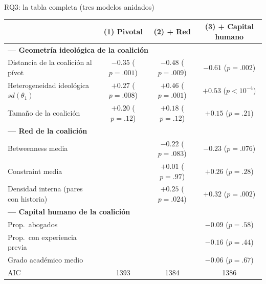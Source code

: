 \documentclass[aspectratio=169,11pt]{beamer}
\newcommand{\emphr}[1]{{\color{ndreddark}\textbf{#1}}}
\begin{document}
\begin{frame}{RQ3: la tabla completa (tres modelos anidados)}
\begin{center}\footnotesize
\begin{tabular}{lccc}
\toprule
 & (1) Pivotal & (2) + Red & (3) + Capital humano \\
\midrule
\multicolumn{4}{l}{\emphr{--- Geometría ideológica de la coalición}}\\
Distancia de la coalición al pívot & $-0.35$ ($p=.001$) & $-0.48$ ($p=.009$) & $-0.61$ ($p=.002$) \\
Heterogeneidad ideológica $sd(\theta_1)$ & $+0.27$ ($p=.008$) & $+0.46$ ($p=.001$) & $+0.53$ ($p<10^{-4}$) \\
Tamaño de la coalición & $+0.20$ ($p=.12$) & $+0.18$ ($p=.12$) & $+0.15$ ($p=.21$) \\
\multicolumn{4}{l}{\emphr{--- Red de la coalición}}\\
Betweenness media & & $-0.22$ ($p=.083$) & $-0.23$ ($p=.076$) \\
Constraint media & & $+0.01$ ($p=.97$) & $+0.26$ ($p=.28$) \\
Densidad interna (pares con historia) & & $+0.25$ ($p=.024$) & $+0.32$ ($p=.002$) \\
\multicolumn{4}{l}{\emphr{--- Capital humano de la coalición}}\\
Prop.\ abogados & & & $-0.09$ ($p=.58$) \\
Prop.\ con experiencia previa & & & $-0.16$ ($p=.44$) \\
Grado académico medio & & & $-0.06$ ($p=.67$) \\
\midrule
AIC & 1393 & 1384 & 1386 \\
\bottomrule
\end{tabular}
\end{center}
\vspace{0.1cm}
\end{frame}
\end{document}
